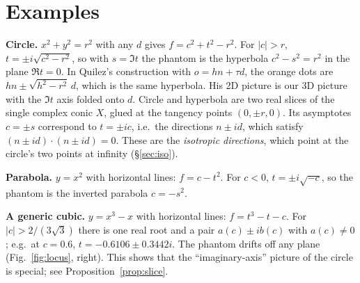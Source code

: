 \documentclass[11pt]{article}
\theoremstyle{definition}\newtheorem{definition}[theorem]{Definition}\newtheorem{remark}[theorem]{Remark}
\begin{document}
\section{Examples}
\textbf{Circle.} $x^2+y^2=r^2$ with any $d$ gives $f=c^2+t^2-r^2$. For $|c|>r$, $t=\pm i\sqrt{c^2-r^2}$, so with $s=\Im t$ the phantom is the hyperbola $c^2-s^2=r^2$ in the plane $\Re t=0$. In Quilez's construction with $o=hn+\tau d$, the orange dots are $hn\pm\sqrt{h^2-r^2}\,d$, which is the same hyperbola. His 2D picture is our 3D picture with the $\Im t$ axis folded onto $d$. Circle and hyperbola are two real slices of the single complex conic $X$, glued at the tangency points $(0,\pm r,0)$. Its asymptotes $c=\pm s$ correspond to $t=\pm ic$, i.e.\ the directions $n\pm i d$, which satisfy $(n\pm id)\cdot(n\pm id)=0$. These are the \emph{isotropic directions}, which point at the circle's two points at infinity (\S\ref{sec:iso}).

\textbf{Parabola.} $y=x^2$ with horizontal lines: $f=c-t^2$. For $c<0$, $t=\pm i\sqrt{-c}$, so the phantom is the inverted parabola $c=-s^2$.

\textbf{A generic cubic.} $y=x^3-x$ with horizontal lines: $f=t^3-t-c$. For $|c|>2/(3\sqrt3)$ there is one real root and a pair $a(c)\pm ib(c)$ with $a(c)\neq0$; e.g.\ at $c=0.6$, $t=-0.6106\pm0.3442i$. The phantom drifts off any plane (Fig.~\ref{fig:locus}, right). This shows that the ``imaginary-axis'' picture of the circle is special; see Proposition~\ref{prop:slice}.
\end{document}
